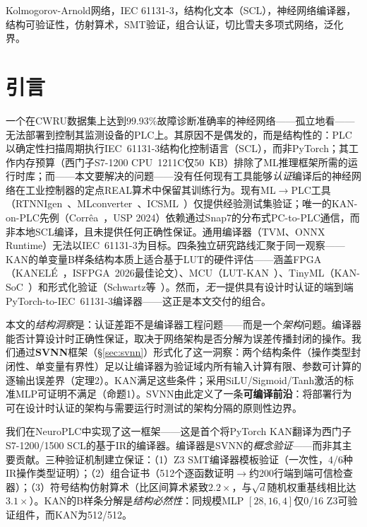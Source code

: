 \documentclass[journal,onecolumn]{IEEEtran}
\newcommand{\neuroplc}{NeuroPLC\xspace}
\theoremstyle{definition}
\theoremstyle{plain}
\theoremstyle{remark}
\begin{document}
\begin{IEEEkeywords}
Kolmogorov-Arnold网络，IEC 61131-3，结构化文本（SCL），神经网络编译器，结构可验证性，仿射算术，SMT验证，组合认证，切比雪夫多项式网络，泛化界。
\end{IEEEkeywords}

\section{引言}
\label{sec:intro}

一个在CWRU数据集上达到99.93\%故障诊断准确率的神经网络——孤立地看——无法部署到控制其监测设备的PLC上。其原因不是偶发的，而是结构性的：PLC以确定性扫描周期执行IEC~61131-3结构化控制语言（SCL），而非PyTorch；其工作内存预算（西门子S7-1200 CPU~1211C仅50~KB）排除了ML推理框架所需的运行时库；而——本文要解决的问题——没有任何现有工具能够\textit{认证}编译后的神经网络在工业控制器的定点REAL算术中保留其训练行为。现有ML$\to$PLC工具（RTNNIgen~\cite{rtnnigen2024}、MLconverter~\cite{mlconverter2025}、ICSML~\cite{icsml2023}）仅提供经验测试集验证；唯一的KAN-on-PLC先例（Corr\^ea~\cite{correa2024kanplc}，USP 2024）依赖通过Snap7的分布式PC-to-PLC通信，而非本地SCL编译，且未提供任何正确性保证。通用编译器（TVM、ONNX Runtime）无法以IEC~61131-3为目标。四条独立研究路线汇聚于同一观察——KAN的单变量B样条结构本质上适合基于LUT的硬件评估——涵盖FPGA（KANEL\'{E}~\cite{kanele2026}，ISFPGA~2026最佳论文）、MCU（LUT-KAN~\cite{lutkan2025}）、TinyML（KAN-SoC~\cite{flores2025kan}）和形式化验证（Schwartz等~\cite{schwartz2026optimal}）。然而，\textit{无一}提供具有设计时认证的端到端PyTorch-to-IEC~61131-3编译器——这正是本文交付的组合。

本文的\textit{结构洞察}是：认证差距不是编译器工程问题——而是一个\textit{架构}问题。编译器能否计算设计时正确性保证，取决于网络架构是否分解为误差传播封闭的操作。我们通过\textbf{SVNN}框架（{\S}\ref{sec:svnn}）形式化了这一洞察：两个结构条件（操作类型封闭性、单变量有界性）足以让编译器为验证域内所有输入计算有限、参数可计算的逐输出误差界（定理2）。KAN满足这些条件；采用SiLU/Sigmoid/Tanh激活的标准MLP可证明不满足（命题1）。SVNN由此定义了一条\textbf{可编译前沿}：将部署行为可在设计时认证的架构与需要运行时测试的架构分隔的原则性边界。

我们在\neuroplc{}中实现了这一框架——这是首个将PyTorch KAN翻译为西门子S7-1200/1500 SCL的基于IR的编译器。编译器是SVNN的\textit{概念验证}——而非其主要贡献。三种验证机制建立保证：（1）Z3 SMT编译器模板验证（一次性，4/6种IR操作类型证明）；（2）组合证书（512个逐函数证明$\to$约200行端到端可信检查器）；（3）符号结构仿射算术（比区间算术紧致$2.2\times$，与$\sqrt{d}$随机权重基线相比达$3.1\times$）。KAN的B样条分解是\textit{结构必然性}：同规模MLP $[28,16,4]$仅0/16 Z3可验证组件，而KAN为512/512。
\end{document}
